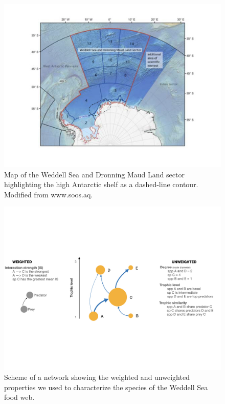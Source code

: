 \documentclass[gc, manuscript]{copernicus}
\begin{document}
\clearpage

\begin{figure}
\includegraphics[width=12cm]{WeddellSea_map} \caption{Map of the Weddell Sea and Dronning Maud Land sector highlighting the high Antarctic shelf as a dashed-line contour. Modified from www.soos.aq.}\label{fig:unnamed-chunk-1}
\end{figure}

\clearpage

\begin{figure}
\includegraphics[width=12cm]{ToyFoodWeb} \caption{Scheme of a network showing the weighted and unweighted properties we used to characterize the species of the Weddell Sea food web.}\label{fig:unnamed-chunk-2}
\end{figure}

\clearpage
\end{document}
